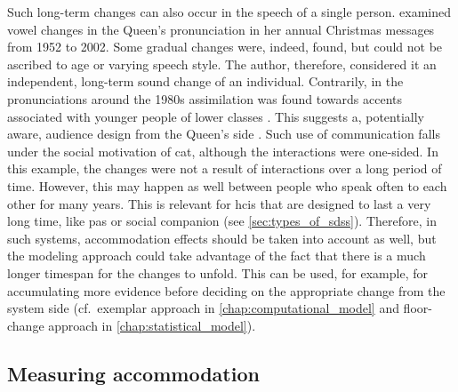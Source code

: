 Such long-term changes can also occur in the speech of a single person.
\citet{Harrington2007evidence} examined vowel changes in the Queen's pronunciation in her annual Christmas messages from 1952 to 2002.
Some gradual changes were, indeed, found, but could not be ascribed to age or varying speech style.
The author, therefore, considered it an independent, long-term sound change of an individual.
Contrarily, in the pronunciations around the 1980s assimilation was found towards accents associated with younger people of lower classes \citep{Harrington2000does, Harrington2000monophthongal}.
This suggests a, potentially aware, audience design from the Queen's side \citep{Bell1984language}.
Such use of communication falls under the social motivation of \ac{cat}, although the interactions were one-sided.
In this example, the changes were not a result of interactions over a long period of time.
However, this may happen as well between people who speak often to each other for many years.
This is relevant for \acp{hci} that are designed to last a very long time, like \acp{pa} or social companion (see \cref{sec:types_of_sdss}).
Therefore, in such systems, accommodation effects should be taken into account as well, but the modeling approach could take advantage of the fact that there is a much longer timespan for the changes to unfold.
This can be used, for example, for accumulating more evidence before deciding on the appropriate change from the system side (cf.\ exemplar approach in \cref{chap:computational_model} and floor-change approach in \cref{chap:statistical_model}).

\subsection{Measuring accommodation} %
\label{subsec:limitations_of_did}

